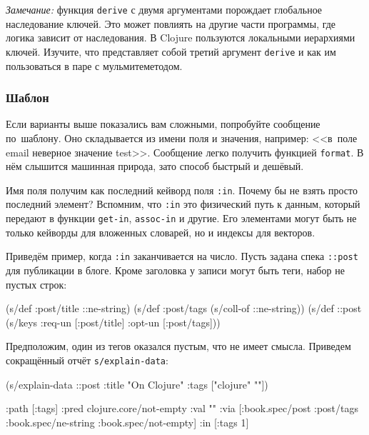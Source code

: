 \emph{Замечание:} функция \verb|derive| с двумя аргументами порождает
глобальное наследование ключей. Это может повлиять на другие части программы,
где логика зависит от наследования. В Clojure пользуются локальными иерархиями
ключей. Изучите, что представляет собой третий аргумент \verb|derive| и как им
пользоваться в паре с мульмитеметодом.

\subsubsection{Шаблон}


Если варианты выше показались вам сложными, попробуйте сообщение по~шаблону. Оно
складывается из имени поля и значения, например: <<в~поле email неверное
значение test>>. Сообщение легко получить функцией \verb|format|. В нём
слышится машинная природа, зато способ быстрый и дешёвый.

Имя поля получим как последний кейворд поля \verb|:in|. Почему бы не взять
просто последний элемент? Вспомним, что \verb|:in| это физический путь к
данным, который передают в функции \verb|get-in|, \verb|assoc-in| и
другие. Его элементами могут быть не только кейворды для вложенных словарей, но
и индексы для векторов.

Приведём пример, когда \verb|:in| заканчивается на число. Пусть задана
спека \verb|::post| для публикации в блоге. Кроме заголовка у записи могут
быть теги, набор не пустых строк:

\begin{english}
  \begin{clojure}
(s/def :post/title ::ne-string)
(s/def :post/tags (s/coll-of ::ne-string))
(s/def ::post (s/keys :req-un [:post/title]
                      :opt-un [:post/tags]))
  \end{clojure}
\end{english}

Предположим, один из тегов оказался пустым, что не имеет смысла. Приведем
сокращённый отчёт \verb|s/explain-data|:

\begin{english}
  \begin{clojure}
(s/explain-data ::post {:title "On Clojure"
                        :tags ["clojure" ""]})

{:path [:tags]
 :pred clojure.core/not-empty
 :val ""
 :via [:book.spec/post
       :post/tags
       :book.spec/ne-string
       :book.spec/not-empty]
 :in [:tags 1]}
  \end{clojure}
\end{english}

